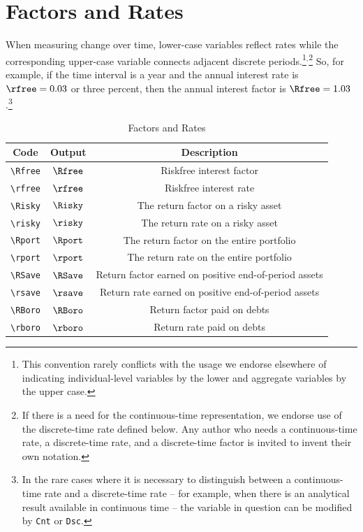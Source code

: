 \documentclass{econark}
\begin{document}
\section{Factors and Rates}
When measuring change over time, lower-case variables reflect rates
while the corresponding upper-case variable connects adjacent discrete periods.\footnote{This
  convention rarely conflicts with the usage we endorse elsewhere of
  indicating individual-level variables by the lower and aggregate
  variables by the upper case.}$^{,}$\footnote{If there is a need for the continuous-time
  representation, we endorse use of the discrete-time rate defined below.  Any
  author who needs a continuous-time rate, a discrete-time rate, and a discrete-time factor
  is invited to invent their own notation.}  So, for example, if the time interval is a year and the annual interest rate is $\rfree=0.03$ or three percent, then
the annual interest factor is $\Rfree=1.03$.\footnote{In the rare cases where it is necessary to distinguish between a continuous-time rate and a discrete-time rate -- for example, when there is an analytical result available in continuous time -- the variable in question can be modified by \texttt{Cnt} or \texttt{Dsc}.}


\begin{table}[ht]
  \centering
  \begin{tabular}{|ccc|}
    \hline
    Code    & Output & Description
    \\ \hline
    \verb|\Rfree| & $\Rfree$     & Riskfree interest factor
    \\ \verb|\rfree| & $\rfree$     & Riskfree interest rate
    \\ \verb|\Risky| & $\Risky$     & The return factor on a risky asset
    \\ \verb|\risky| & $\risky$     & The return rate on a risky asset
    \\ \verb|\Rport| & $\Rport$     & The return factor on the entire portfolio
    \\ \verb|\rport| & $\rport$     & The return rate on the entire portfolio
    \\ \verb|\RSave| & $\RSave$     & Return factor earned on positive end-of-period assets
    \\ \verb|\rsave| & $\rsave$     & Return rate earned on positive end-of-period assets
    \\ \verb|\RBoro| & $\RBoro$     & Return factor paid on debts
    \\ \verb|\rboro| & $\rboro$     & Return rate paid on debts
    \\	\hline
  \end{tabular}
  \caption{Factors and Rates}
  \label{table:Factors}
\end{table}
\end{document}
